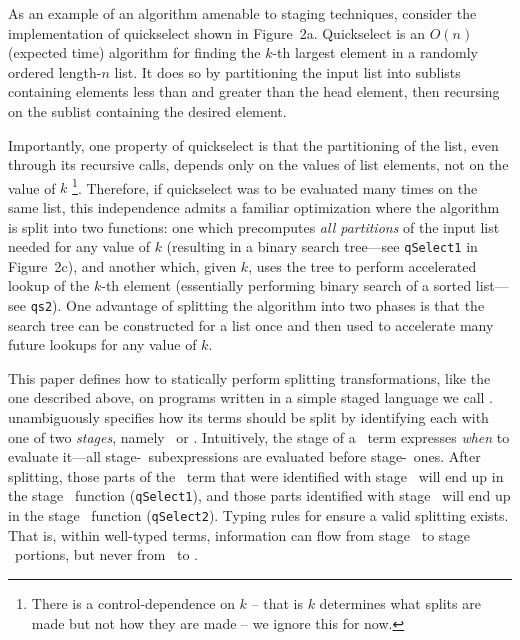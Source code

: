As an example of an algorithm amenable to staging techniques,
consider the implementation of quickselect shown in Figure~2a.
Quickselect is an $O(n)$ (expected time) algorithm for finding the $k$-th largest element in a randomly ordered length-$n$ list.
It does so by partitioning the input list into sublists containing elements less than and greater than the head element, 
then recursing on the sublist containing the desired element.

Importantly, one property of quickselect is that the partitioning of the list, even through its recursive calls, depends only on the values of list elements, not on the value of $k$ 
\footnote{There is a control-dependence on $k$ -- that is $k$ determines what splits are made but not how they are made -- we ignore this for now.}.  Therefore, if quickselect was to be evaluated many times on the same list, this independence admits a familiar optimization where the algorithm is split into two functions: one which precomputes \emph{all partitions} of the input list needed for any value of $k$ (resulting in a binary search tree---see \texttt{qSelect1} in Figure~2c),
and another which, given $k$, uses the tree to perform accelerated lookup of the $k$-th element (essentially performing binary search of a sorted list---see \texttt{qs2}).
One advantage of splitting the algorithm into two phases is that the search tree can be constructed for a list once
and then used to accelerate many future lookups for any value of $k$.

This paper defines how to statically perform splitting transformations, like the one described above, on programs written in a simple staged language we call \lang.  \lang unambiguously specifies how its terms should be split
by identifying each with one of two {\em stages}, namely \bbone\ or \bbtwo.
Intuitively, the stage of a \lang\ term expresses \emph{when} to evaluate it---all stage-\bbone\
subexpressions are evaluated before stage-\bbtwo\ ones.  
After splitting, those parts of the \lang\ term that were identified with stage \bbone\ 
will end up in the stage \bbone\ function ({\tt qSelect1}), 
and those parts identified with stage \bbtwo\ will end up in the stage \bbtwo\ function ({\tt qSelect2}).
Typing rules for \lang ensure a valid splitting exists.  That is, 
within well-typed terms, information can flow from stage \bbone\ to stage \bbtwo\ portions,
but never from \bbtwo\ to \bbone.

